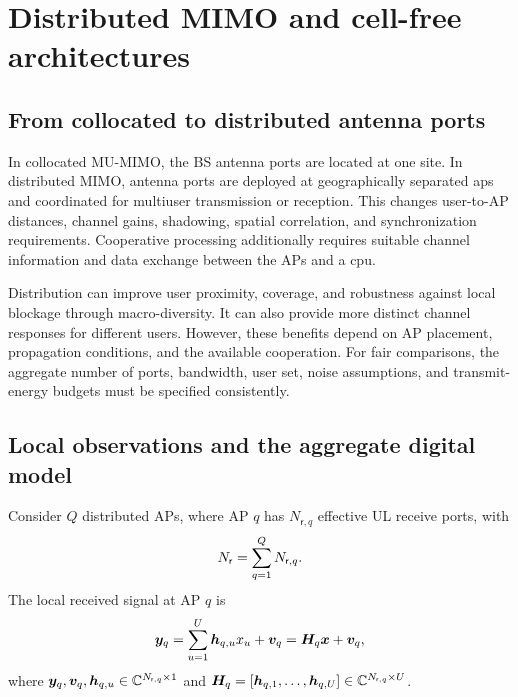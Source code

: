 \section{Distributed MIMO and cell-free architectures}
\label{sec:distributed-05}

\subsection{From collocated to distributed antenna ports}
In collocated MU-MIMO, the BS antenna ports are located at one site. In distributed MIMO, antenna ports are deployed at geographically separated \acp{ap} and coordinated for multiuser transmission or reception. This changes user-to-AP distances, channel gains, shadowing, spatial correlation, and synchronization requirements. Cooperative processing additionally requires suitable channel information and data exchange between the APs and a \ac{cpu}.

Distribution can improve user proximity, coverage, and robustness against local blockage through macro-diversity. It can also provide more distinct channel responses for different users. However, these benefits depend on AP placement, propagation conditions, and the available cooperation. For fair comparisons, the aggregate number of ports, bandwidth, user set, noise assumptions, and transmit-energy budgets must be specified consistently.

\subsection{Local observations and the aggregate digital model}
Consider $Q$ distributed APs, where AP $q$ has $N_{\mathsf r,q}$ effective UL receive ports, with
\begin{equation*}
	N_{\mathsf{r}}=\sum_{q=1}^{Q}N_{\mathsf r,q}.
\end{equation*}
The local received signal at AP $q$ is
\begin{equation}
	\bm{y}_q=\sum_{u=1}^{U}\bm{h}_{q,u}x_u+\bm{v}_q
	=\bm{H}_q\bm{x}+\bm{v}_q,
	\label{eq:local-05}
\end{equation}
where $\bm{y}_q,\bm{v}_q,\bm{h}_{q,u}\in\mathbb{C}^{N_{\mathsf r,q}\times1}$ and
$\bm{H}_q=[\bm{h}_{q,1},\ldots,\bm{h}_{q,U}]\in\mathbb{C}^{N_{\mathsf r,q}\times U}$.

